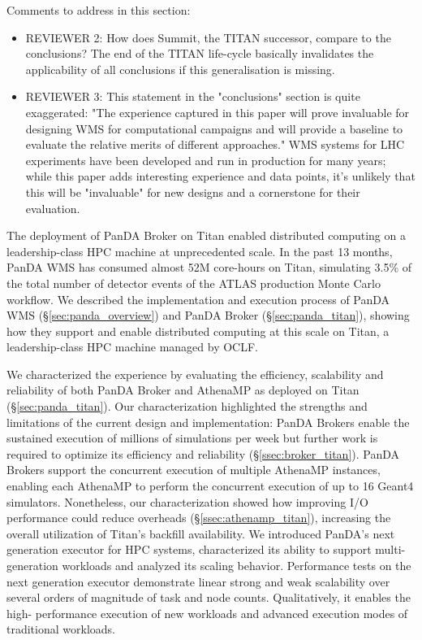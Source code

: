 \ifreview
Comments to address in this section:
\begin{itemize}
	\color{red} 
	\item REVIEWER 2: How does Summit, the TITAN successor, compare to the
	conclusions? The end of the TITAN life-cycle basically invalidates the
	applicability of all conclusions if this generalisation is missing.
	\item REVIEWER 3: This statement in the "conclusions" section is quite
	exaggerated: "The experience captured in this paper will prove invaluable
	for designing WMS for computational campaigns and will provide a baseline
	to evaluate the relative merits of different approaches." WMS systems for
	LHC experiments have been developed and run in production for many years;
	while this paper adds interesting experience and data points, it's
	unlikely that this will be "invaluable" for new designs and a cornerstone
	for their evaluation. 
\end{itemize}
\fi

The deployment of PanDA Broker on Titan enabled distributed computing on a
leadership-class HPC machine at unprecedented scale. In the past 13 months,
PanDA WMS has consumed almost 52M core-hours on Titan, simulating 3.5\% of
the total number of detector events of the ATLAS production Monte Carlo
workflow. We described the implementation and execution process of PanDA WMS
(\S\ref{sec:panda_overview}) and PanDA Broker (\S\ref{sec:panda_titan}),
showing how they support and enable distributed computing at this scale on
Titan, a leadership-class HPC machine managed by OCLF.

We characterized the experience by evaluating the efficiency, scalability and
reliability of both PanDA Broker and AthenaMP as deployed on Titan
(\S\ref{sec:panda_titan}). Our characterization highlighted the strengths and
limitations of the current design and implementation: PanDA Brokers enable
the sustained execution of millions of simulations per week but further work
is required to optimize its efficiency and reliability
(\S\ref{ssec:broker_titan}). PanDA Brokers support the concurrent execution
of multiple AthenaMP instances, enabling each AthenaMP to perform the
concurrent execution of up to 16 Geant4 simulators. Nonetheless, our
characterization showed how improving I/O performance could reduce overheads
(\S\ref{ssec:athenamp_titan}), increasing the overall utilization of Titan's
backfill availability. We introduced PanDA's next generation executor for HPC
systems, characterized its ability to support multi-generation workloads and
analyzed its scaling behavior.  Performance tests on the next generation
executor demonstrate linear strong and weak scalability over several orders
of magnitude  of task and node counts.  Qualitatively, it enables the high-
performance execution of new workloads and advanced execution modes of
traditional workloads.

